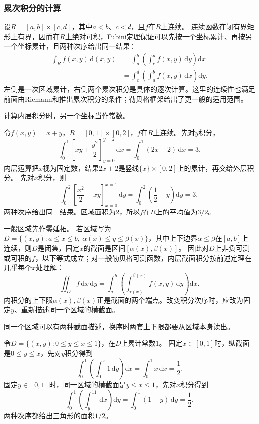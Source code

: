 \subsubsection{累次积分的计算}

设$R=[a,b]\times[c,d]$，其中$a<b$、$c<d$，且$f$在$R$上连续。
连续函数在闭有界矩形上有界，因而在$R$上绝对可积，Fubini定理保证可以先按一个坐标累计、再按另一个坐标累计，且两种次序给出同一结果：
\[
 \begin{aligned}
 \int_R f(x,y)\,\mathrm d(x,y)
 &=\int_a^b\left(\int_c^d f(x,y)\,\mathrm dy\right)\mathrm dx\\
 &=\int_c^d\left(\int_a^b f(x,y)\,\mathrm dx\right)\mathrm dy.
 \end{aligned}
\]
左侧是一次区域累计，右侧两个累次积分是具体的逐次计算。这里的连续性也满足前面由Riemann和推出累次积分的条件；勒贝格框架给出了更一般的适用范围。

计算内层积分时，另一个坐标当作常数。
\begin{example}
\label{ex:region-rectangle-iterated}
令$f(x,y)=x+y$，$R=[0,1]\times[0,2]$，$f$在$R$上连续。先对$y$积分，
\[
 \int_0^1\left[xy+\frac{y^2}{2}\right]_{y=0}^{y=2}\,\mathrm dx
 =\int_0^1(2x+2)\,\mathrm dx=3.
\]
内层运算把$x$视为固定数，结果$2x+2$是竖线$\{x\}\times[0,2]$上的累计，再交给外层积分。
先对$x$积分，则
\[
 \int_0^2\left[\frac{x^2}{2}+xy\right]_{x=0}^{x=1}\,\mathrm dy
 =\int_0^2\left(\frac12+y\right)\mathrm dy=3,
\]
两种次序给出同一结果。区域面积为$2$，所以$f$在$R$上的平均值为$3/2$。
\end{example}

一般区域先作零延拓。
若区域写为$D=\{(x,y):a\leq x\leq b,\ \alpha(x)\leq y\leq\beta(x)\}$，其中上下边界$\alpha\leq\beta$在$[a,b]$上连续，则$D$是闭集，固定$x$的截面是区间$[\alpha(x),\beta(x)]$。
因此对$D$上非负可测或可积的$f$，以下等式成立；对一般勒贝格可测函数，内层截面积分按前述定理在几乎每个$x$处理解：
\[
 \iint_Df\,\mathrm dx\,\mathrm dy=\int_a^b\left(\int_{\alpha(x)}^{\beta(x)}f(x,y)\,\mathrm dy\right)\mathrm dx.
\]
内积分的上下限$\alpha(x),\beta(x)$正是截面的两个端点。改变积分次序时，应改为固定$y$、重新描述同一个区域的横截面。

同一个区域可以有两种截面描述，换序时两套上下限都要从区域本身读出。
\begin{example}[三角形区域上交换积分次序]
\label{ex:region-triangle-order-swap}
令$D=\{(x,y):0\leq y\leq x\leq1\}$，在$D$上累计常数$1$。
固定$x\in[0,1]$时，纵截面是$0\leq y\leq x$，先对$y$积分得到
\[
 \int_0^1\left(\int_0^x1\,\mathrm dy\right)\mathrm dx=\int_0^1x\,\mathrm dx=\frac12.
\]
固定$y\in[0,1]$时，同一区域的横截面是$y\leq x\leq1$，先对$x$积分得到
\[
 \int_0^1\left(\int_y^11\,\mathrm dx\right)\mathrm dy=\int_0^1(1-y)\,\mathrm dy=\frac12.
\]
两种次序都给出三角形的面积$1/2$。
\end{example}

